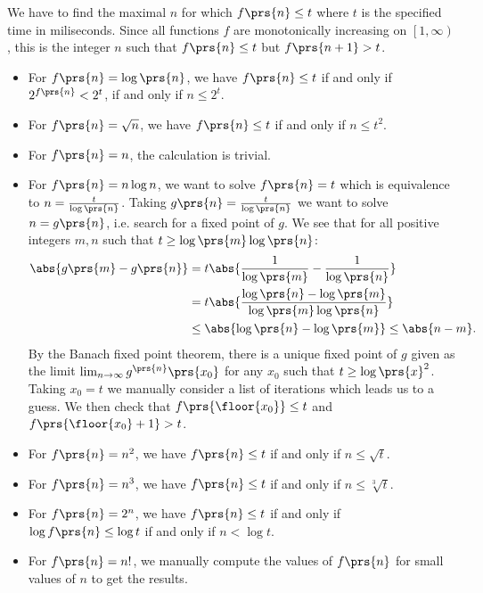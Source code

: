 \documentclass[oneside]{scrbook}
\theoremstyle{definition}
\begin{document}
\begin{problem}
    We have to find the maximal $n$ for which $f\prs{n} \leq t$ where $t$ is the specified time in miliseconds.
    Since all functions $f$ are monotonically increasing on $\left[1, \infty\right)$, this is the integer $n$ such that $f\prs{n} \leq t$ but $f\prs{n+1} > t$.
    
    \begin{itemize}
    \item For $f\prs{n} = \log\prs{n}$, we have $f\prs{n} \leq t$ if and only if $2^{f\prs{n}} < 2^t$, if and only if $n \leq 2^t$.
    \item For $f\prs{n} = \sqrt{n}$, we have $f\prs{n} \leq t$ if and only if $n \leq t^2$.
    \item For $f\prs{n} = n$, the calculation is trivial.
    \item For $f\prs{n} = n \log n$, we want to solve $f\prs{n} = t$ which is equivalence to $n = \frac{t}{\log\prs{n}}$. Taking $g\prs{n} = \frac{t}{\log\prs{n}}$ we want to solve $n = g\prs{n}$, i.e. search for a fixed point of $g$. We see that for all positive integers $m,n$ such that $t \geq \log\prs{m}\log\prs{n}$:
    \begin{align*}
    \abs{g\prs{m} - g\prs{n}} &=
    t \abs{\frac{1}{\log\prs{m}} - \frac{1}{\log\prs{n}}}
    \\&=
    t \abs{\frac{\log\prs{n} - \log\prs{m}}{\log\prs{m}\log\prs{n}}}
    \\&\leq
    \abs{\log\prs{n} - \log\prs{m}} \leq \abs{n-m} \text{.}
    \end{align*}
    By the Banach fixed point theorem, there is a unique fixed point of $g$ given as the limit $\lim_{n \to \infty} g^{\prs{n}}\prs{x_0}$ for any $x_0$ such that $t \geq \log\prs{x}^2$. Taking $x_0 = t$ we manually consider a list of iterations which leads us to a guess. We then check that $f\prs{\floor{x_0}} \leq t$ and $f\prs{\floor{x_0}+1} > t$.
    \item For $f\prs{n} = n^2$, we have $f\prs{n} \leq t$ if and only if $n \leq \sqrt{t}$.
    \item For $f\prs{n} = n^3$, we have $f\prs{n} \leq t$ if and only if $n \leq \sqrt[3]{t}$.
    \item For $f\prs{n} = 2^n$, we have $f\prs{n} \leq t$ if and only if $\log f\prs{n} \leq \log t$ if and only if $n < \log t$.
    \item For $f\prs{n} = n!$, we manually compute the values of $f\prs{n}$ for small values of $n$ to get the results.
    \end{itemize}

\end{problem}
\end{document}
